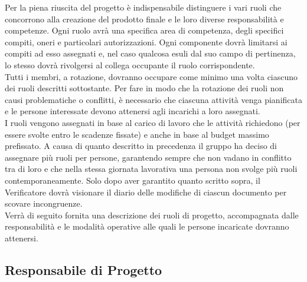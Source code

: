 Per la piena riuscita del progetto è indispensabile distinguere i vari ruoli che concorrono alla creazione del prodotto finale e le loro diverse responsabilità e competenze.
Ogni ruolo avrà una specifica area di competenza, degli specifici compiti, oneri e particolari autorizzazioni. Ogni componente dovrà limitarsi ai compiti ad esso assegnati e, nel caso qualcosa esuli dal suo campo di pertinenza, lo stesso dovrà rivolgersi al collega occupante il ruolo corrispondente.\\
Tutti i membri, a rotazione, dovranno occupare come minimo una volta ciascuno dei ruoli descritti sottostante. Per fare in modo che la rotazione dei ruoli non causi problematiche o conflitti, è necessario che ciascuna attività venga pianificata e le persone interessate devono attenersi agli incarichi a loro assegnati.\\
I ruoli vengono assegnati in base al carico di lavoro che le attivit\`{a} richiedono (per essere svolte entro le scadenze fissate) e anche in base al budget massimo prefissato. A causa di quanto descritto in precedenza il gruppo ha deciso di assegnare più ruoli per persone, garantendo sempre che non vadano in conflitto tra di loro e che nella stessa giornata lavorativa una persona non svolge più ruoli contemporaneamente.
Solo dopo aver garantito quanto scritto sopra, il Verificatore dovrà visionare il diario delle modifiche di ciascun documento per scovare incongruenze.\\
Verrà di seguito fornita una descrizione dei ruoli di progetto, accompagnata dalle responsabilità e le modalità operative alle quali le persone incaricate dovranno attenersi.

\subsection{Responsabile di Progetto} %

